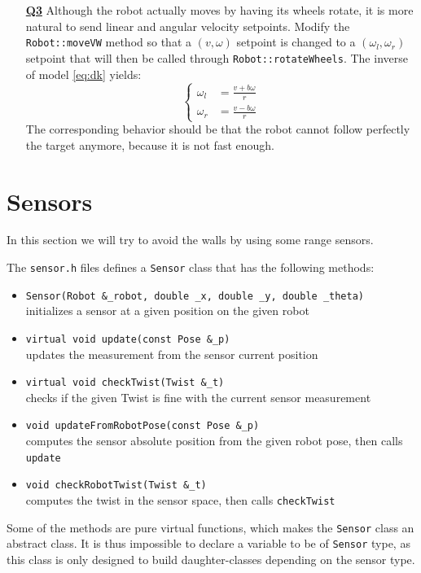 \documentclass{ecnreport}
\begin{document}
\begin{itemize}
\medskip\item[\textbf{\underline{Q3}}] Although the robot actually moves by having its wheels rotate, 
it is more natural to send linear and angular velocity setpoints. Modify the 
\texttt{Robot::moveVW} method so that a $(v,\omega)$ setpoint is changed to a $(\omega_l,\omega_r)$ setpoint that will then be called through \texttt{Robot::rotateWheels}.
 The inverse of model \eqref{eq:dk} yields:
\begin{equation}
\left\{\begin{array}{ll}
\omega_l &= \displaystyle \frac{v + b\omega}{r} \\
\omega_r &= \displaystyle \frac{v - b\omega}{r}
\end{array}\right.
\end{equation} 
The corresponding behavior should be that the robot cannot follow perfectly the target anymore, because it is not fast enough.
\end{itemize}

%  
\newpage

\section{Sensors}

In this section we will try to avoid the walls by using some range sensors.

The \texttt{sensor.h} files defines a \texttt{Sensor} class that has the following methods:
\begin{itemize}
\item \texttt{Sensor(Robot \&\_robot, double \_x, double \_y, double \_theta)}\\initializes a sensor at a given position on the given robot
\item \texttt{virtual void update(const Pose \&\_p)}\\ updates the measurement from the sensor current position
\item \texttt{virtual void checkTwist(Twist \&\_t)}\\ checks if the given Twist is fine with the current sensor measurement
\item \texttt{void updateFromRobotPose(const Pose \&\_p)}\\ computes the sensor absolute position from the given robot pose, then calls \texttt{update}
\item \texttt{void checkRobotTwist(Twist \&\_t)}\\ computes the twist in the sensor space, then calls \texttt{checkTwist}
\end{itemize}
Some of the methods are pure virtual functions, which makes the \texttt{Sensor} class an abstract class.
It is thus impossible to declare a variable to be of \texttt{Sensor} type, as this class is only designed to build daughter-classes depending on the sensor type.
\end{document}
